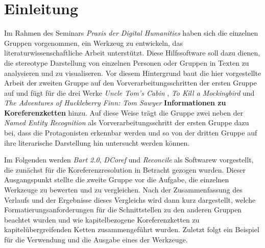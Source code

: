 \documentclass[a4paper,12pt,titlepage=true, ngerman]{scrartcl}
\begin{document}



\newpage

\listoffigures



\newpage

\listoftables


\newpage
{}

\section{Einleitung}\label{Einleitung} %
 
Im Rahmen des Seminars \emph{Praxis der Digital Humanities} haben sich die einzelnen Gruppen vorgenommen, ein Werkzeug zu entwickeln, das literaturwissenschaftliche Arbeit unterstützt. Diese Hilfssoftware soll dazu dienen, die stereotype Darstellung von einzelnen Personen oder Gruppen in Texten zu analysieren und zu visualiseren. Vor diesem Hintergrund baut die hier vorgestellte Arbeit der zweiten Gruppe auf den Vorverarbeitungsschritten der ersten Gruppe auf und fügt für die drei Werke \emph{Uncle Tom's Cabin}  \autocite[]{chris_uncle}, \emph{To Kill a Mockingbird}  \autocite[]{chris_bird} und \emph{The Adventures of Huckleberry Finn: Tom Sawyer} \autocite[]{chris_adventures} \textbf{Informationen zu Koreferenzketten} hinzu. Auf diese Weise trägt die Gruppe zwei neben der \emph{Named Entity Recognition} als Vorverarbeitungsschritt der ersten Gruppe dazu bei, dass die Protagonisten erkennbar werden und so von der dritten Gruppe auf ihre literarische Darstellung hin untersucht werden können.

Im Folgenden werden \emph{Bart 2.0}, \emph{DCoref} und \emph{Reconcile} als Softwarew vorgestellt, die zunächst für die Koreferenzresolution in Betracht gezogen wurden. Dieser Ausgangspunkt stellte die zweite Gruppe vor die Aufgabe, die einzelnen Werkzeuge zu bewerten und zu vergleichen. Nach der Zusammenfassung des Verlaufs und der Ergebnisse dieses Vergleichs wird dann kurz dargestellt, welche Formatierungsanforderungen für die Schnittstellen zu den anderen Gruppen beachtet wurden und wie kapitelbezogene Koreferenzketten zu kapitelübergreifenden Ketten zusammengeführt wurden. Zuletzt folgt ein Beispiel für die Verwendung und die Ausgabe eines der Werkzeuge.
\end{document}
